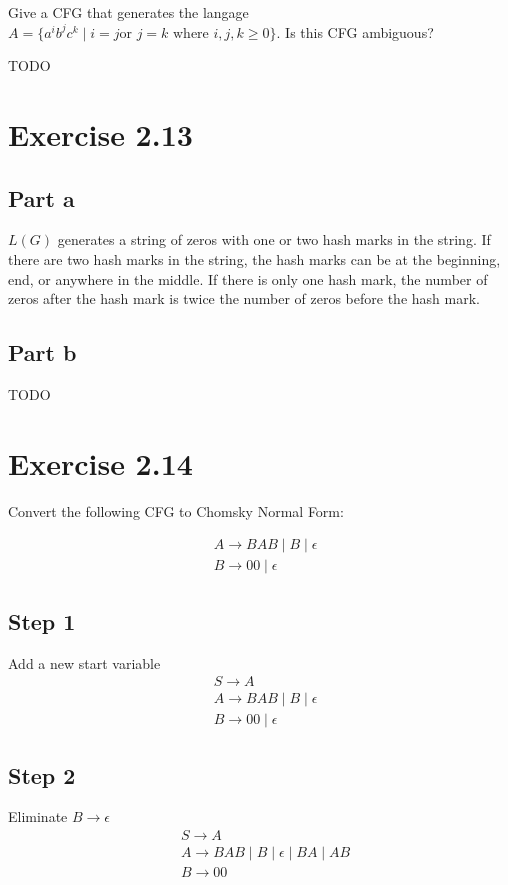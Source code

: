 \documentclass{article}
\newcommand{\where}{\mid}
\begin{document}
Give a CFG that generates the langage $A = \{ a^i b^j c^k \where i = j \text{
or } j = k \text{ where } i, j, k \geq 0 \}$. Is this CFG ambiguous?

TODO

\section{Exercise 2.13}

\subsection{Part a}

$L(G)$ generates a string of zeros with one or two hash marks in the string.
If there are two hash marks in the string, the hash marks can be at the
beginning, end, or anywhere in the middle. If there is only one hash mark, the
number of zeros after the hash mark is twice the number of zeros before the hash mark.

\subsection{Part b}

TODO

\section{Exercise 2.14}

Convert the following CFG to Chomsky Normal Form:

\begin{align*}
	& A \rightarrow BAB \mid B \mid \epsilon\\
	& B \rightarrow 00 \mid \epsilon
\end{align*}

\subsection*{Step 1}
	Add a new start variable
	\begin{align*}
		& S \rightarrow A\\
		& A \rightarrow BAB \mid B \mid \epsilon\\
		& B \rightarrow 00 \mid \epsilon
	\end{align*}
\subsection*{Step 2}
	Eliminate $B \rightarrow \epsilon$
	\begin{align*}
		& S \rightarrow A\\
		& A \rightarrow BAB \mid B \mid \epsilon \mid BA \mid AB\\
		& B \rightarrow 00 
	\end{align*}
\end{document}
